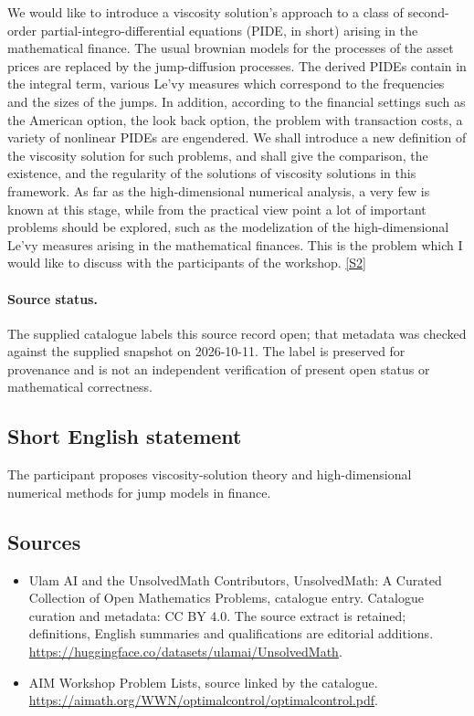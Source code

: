 \documentclass[11pt]{article}
\newcommand{\sref}[2]{\hyperlink{source:#1:#2}{[S#2]}}
\begin{document}
We would like to introduce a viscosity solution's approach to a class of second-order partial-integro-differential equations (PIDE, in short) arising in the mathematical finance. The usual brownian models for the processes of the asset prices are replaced by the jump-diffusion processes. The derived PIDEs contain in the integral term, various Le'vy measures which correspond to the frequencies and the sizes of the jumps. In addition, according to the financial settings such as the American option, the look back option, the problem with transaction costs, a variety of nonlinear PIDEs are engendered. We shall introduce a new definition of the viscosity solution for such problems, and shall give the comparison, the existence, and the regularity of the solutions of viscosity solutions in this framework. As far as the high-dimensional numerical analysis, a very few is known at this stage, while from the practical view point a lot of important problems should be explored, such as the modelization of the high-dimensional Le'vy measures arising in the mathematical finances. This is the problem which I would like to discuss with the participants of the workshop. \sref{statement}{2}
\paragraph{Source status.}
The supplied catalogue labels this source record open; that metadata was checked against the supplied snapshot on 2026-10-11. The label is preserved for provenance and is not an independent verification of present open status or mathematical correctness.
\subsection{Short English statement}
The participant proposes viscosity-solution theory and high-dimensional numerical methods for jump models in finance.
\subsection{Sources}
\begin{itemize}
\item[\hypertarget{source:statement:1}{S1}] Ulam AI and the UnsolvedMath Contributors, UnsolvedMath: A Curated Collection of Open Mathematics Problems, catalogue entry. Catalogue curation and metadata: CC BY 4.0. The source extract is retained; definitions, English summaries and qualifications are editorial additions.
\url{https://huggingface.co/datasets/ulamai/UnsolvedMath}.
\item[\hypertarget{source:statement:2}{S2}] AIM Workshop Problem Lists, source linked by the catalogue.
\url{https://aimath.org/WWN/optimalcontrol/optimalcontrol.pdf}.
\end{itemize}
\end{document}
